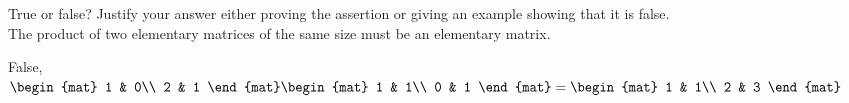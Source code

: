 
\begin{Exercise}[
name={},
title={}, 
difficulty=0,
origin={\cite{OV}}]
True or false? Justify your answer either proving the assertion or giving an example showing that it is false.\\
The product of two elementary matrices of the same size must  be an elementary matrix.
\end{Exercise}

\begin{Answer}
False, 
$
\begin{mat}
1 & 0\\
2 & 1
\end{mat}
\begin{mat}
1 & 1\\
0 & 1
\end{mat}
=
\begin{mat}
1 & 1\\
2 & 3
\end{mat}
$
\end{Answer}

